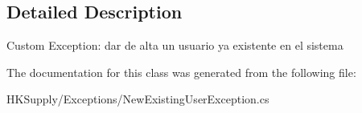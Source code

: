 \subsection{Detailed Description}
Custom Exception\+: dar de alta un usuario ya existente en el sistema 



The documentation for this class was generated from the following file\+:\begin{DoxyCompactItemize}
\item 
H\+K\+Supply/\+Exceptions/New\+Existing\+User\+Exception.\+cs\end{DoxyCompactItemize}
